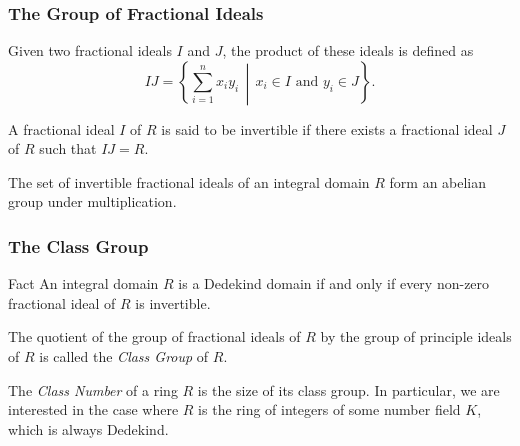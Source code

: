 \documentclass[handout]{beamer}
\begin{document}
\begin{frame}
	
	\frametitle{The Group of Fractional Ideals}

	\begin{definition}
		Given two fractional ideals $I$ and $J$, the product of these ideals is defined as
		\[
			IJ = \left\{ \sum_{i = 1}^{n} x_i y_i \,\middle|\, x_i \in I \text{ and } y_i \in J \right\}.
		\]
	\end{definition}
	\pause

	\begin{definition}
		A fractional ideal $I$ of $R$ is said to be invertible if there exists a fractional ideal $J$ of $R$ such that $IJ = R$.
	\end{definition}
	\pause

	\begin{definition}
		The set of invertible fractional ideals of an integral domain $R$ form an abelian group under multiplication. 
	\end{definition}	

\end{frame}

\begin{frame}

	\frametitle{The Class Group}

	\begin{block}{Fact}
		An integral domain $R$ is a Dedekind domain if and only if every non-zero fractional ideal of $R$ is invertible.
	\end{block}
	\pause

	\begin{definition}
		The quotient of the group of fractional ideals of $R$ by the group of principle ideals of $R$ is called the \emph{Class Group} of $R$.
	\end{definition}
	\pause

	\begin{definition}
		The \emph{Class Number} of a ring $R$ is the size of its class group. In particular, we are interested in the case where $R$ is the ring of integers of some number field $K$, which is always Dedekind.
	\end{definition}
	
\end{frame}
\end{document}
